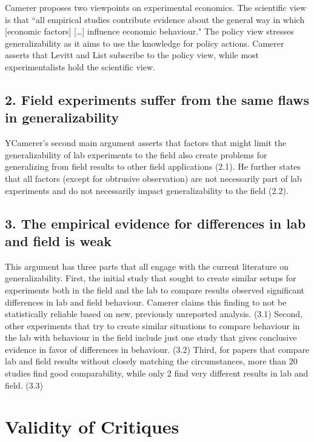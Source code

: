 \documentclass{article}
\begin{document}
Camerer proposes two viewpoints on experimental economics. The scientific view is that “all empirical studies contribute evidence about the general way in which [economic factors] […] influence economic behaviour." The policy view stresses generalizability as it aims to use the knowledge for policy actions. 
Camerer asserts that Levitt and List subscribe to the policy view, while most experimentalists hold the scientific view. 

\subsection*{2. Field experiments suffer from the same flaws in generalizability}

YCamerer’s second main argument asserts that factors that might limit the generalizability of lab experiments to the field also create problems for generalizing from field results to other field applications (2.1). He further states that all factors (except for obtrusive observation) are not necessarily part of lab experiments and do not necessarily impact generalizability to the field (2.2). 


\subsection*{3. The empirical evidence for differences in lab and field is weak}


This argument has three parts that all engage with the current literature on generalizability. First, the initial study that sought to create similar setups for experiments both in the field and the lab to compare results \citep{List.2006} observed significant differences in lab and field behaviour. Camerer claims this finding to not be statistically reliable based on new, previously unreported analysis. (3.1)
Second, other experiments that try to create similar situations to compare behaviour in the lab with behaviour in the field include just one study that gives conclusive evidence in favor of differences in behaviour. (3.2)
Third, for papers that compare lab and field results without closely matching the circumstances, more than 20 studies find good comparability, while only 2 find very different results in lab and field. (3.3)

\section*{Validity of Critiques}
\end{document}
